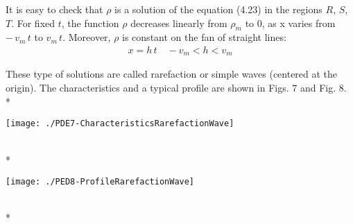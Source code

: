 \documentclass[../main.tex]{subfiles}
\begin{document}
It is easy to check that $\rho$ is a solution of the equation (4.23) in the regions $R$, $S$, $T$. For fixed $t$, the function $\rho$ decreases linearly from $\rho_m$ to 0, as x varies from $− \, v_m \, t$ to $v_m \, t$. Moreover, $\rho$ is constant on the fan of straight lines:
\begin{align}
    x = h \, t \quad -v_m < h < v_m \label{eq:33}
\end{align}

These type of solutions are called rarefaction or simple waves (centered at the origin). The characteristics and a typical profile are shown in Figs. 7 and Fig. 8.
\\*

\begin{wrapfigure}{\linewidth} \label{fig:7}
\centering
\texttt{[image: ./PDE7-CharacteristicsRarefactionWave]}
    \begin{center}
    \end{center}
\end{wrapfigure}
\\*

\begin{wrapfigure}{\linewidth} \label{fig:8}
\centering
\texttt{[image: ./PED8-ProfileRarefactionWave]}
    \begin{center}
    \end{center}
\end{wrapfigure}
\\*
\end{document}
